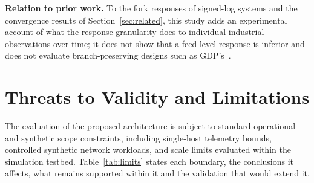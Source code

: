 \documentclass[futureinternet,article,submit,moreauthors]{Definitions/mdpi}
\begin{document}
\textbf{Relation to prior work.} To the fork responses of signed-log systems and the convergence results of Section~\ref{sec:related}, this study adds an experimental account of what the response granularity does to individual industrial observations over time; it does not show that a feed-level response is inferior and does not evaluate branch-preserving designs such as GDP's~\cite{mor2019gdp}.

\section{Threats to Validity and Limitations}\label{sec:limitations}

The evaluation of the proposed architecture is subject to standard operational and synthetic scope constraints, including single-host telemetry bounds, controlled synthetic network workloads, and scale limits evaluated within the simulation testbed. Table~\ref{tab:limits} states each boundary, the conclusions it affects, what remains supported within it and the validation that would extend it.
\end{document}
